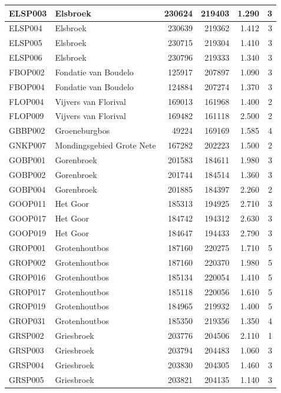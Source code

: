 \documentclass[11pt,]{book}
\begin{document}
\begin{table}
\begin{tabular}[t]{l|l|r|r|r|r}
\hline
ELSP003 & Elsbroek & 230624 & 219403 & 1.290 & 3\\
\hline
ELSP004 & Elsbroek & 230639 & 219362 & 1.412 & 3\\
\hline
ELSP005 & Elsbroek & 230715 & 219304 & 1.410 & 3\\
\hline
ELSP006 & Elsbroek & 230796 & 219333 & 1.340 & 3\\
\hline
FBOP002 & Fondatie van Boudelo & 125917 & 207897 & 1.090 & 3\\
\hline
FBOP004 & Fondatie van Boudelo & 124884 & 207274 & 1.370 & 3\\
\hline
FLOP004 & Vijvers van Florival & 169013 & 161968 & 1.400 & 2\\
\hline
FLOP009 & Vijvers van Florival & 169482 & 161118 & 2.500 & 2\\
\hline
GBBP002 & Groeneburgbos & 49224 & 169169 & 1.585 & 4\\
\hline
GNKP007 & Mondingsgebied Grote Nete & 167282 & 202223 & 1.500 & 2\\
\hline
GOBP001 & Gorenbroek & 201583 & 184611 & 1.980 & 3\\
\hline
GOBP002 & Gorenbroek & 201744 & 184514 & 1.360 & 3\\
\hline
GOBP004 & Gorenbroek & 201885 & 184397 & 2.260 & 2\\
\hline
GOOP011 & Het Goor & 185313 & 194925 & 2.710 & 3\\
\hline
GOOP017 & Het Goor & 184742 & 194312 & 2.630 & 3\\
\hline
GOOP019 & Het Goor & 184647 & 194433 & 2.790 & 3\\
\hline
GROP001 & Grotenhoutbos & 187160 & 220275 & 1.710 & 5\\
\hline
GROP002 & Grotenhoutbos & 187160 & 220370 & 1.980 & 5\\
\hline
GROP016 & Grotenhoutbos & 185134 & 220054 & 1.410 & 5\\
\hline
GROP017 & Grotenhoutbos & 185118 & 220056 & 1.610 & 5\\
\hline
GROP019 & Grotenhoutbos & 184965 & 219932 & 1.400 & 5\\
\hline
GROP031 & Grotenhoutbos & 185350 & 219356 & 1.350 & 4\\
\hline
GRSP002 & Griesbroek & 203776 & 204506 & 2.110 & 1\\
\hline
GRSP003 & Griesbroek & 203794 & 204483 & 1.060 & 3\\
\hline
GRSP004 & Griesbroek & 203830 & 204305 & 1.460 & 3\\
\hline
GRSP005 & Griesbroek & 203821 & 204135 & 1.140 & 3\\

\end{tabular}
\end{table}
\end{document}
